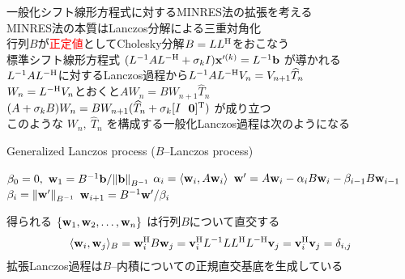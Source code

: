 

一般化シフト線形方程式に対するMINRES法の拡張を考える\\
\myitem MINRES法の本質はLanczos分解による三重対角化\\
行列$B$が\textcolor{red}{正定値}としてCholesky分解$B=LL^{\mathrm{H}}$をおこなう\\
\myitem 標準シフト線形方程式 $(L^{-1}AL^{-\mathrm{H}} + \sigma_{k}I)\vb{x}'^{(k)} = L^{-1}\vb{b}$ が導かれる\\
\myitem $L^{-1}AL^{-\mathrm{H}}$に対するLanczos過程から$L^{-1}AL^{-\mathrm{H}}V_{n} = V_{n+1}\widehat{T}_{n}$\\
\myitem $W_{n} = L^{-\mathrm{H}}V_{n}$とおくと$AW_{n}=BW_{n+1}\widehat{T}_{n}$\\
\myitem $(A+\sigma_{k}B)W_{n}=BW_{n+1}(\widehat{T}_{n} + \sigma_{k}[I \ \  \vb{0}]^{\mathrm{T}})$ が成り立つ\\
このような $W_{n},\ \widehat{T}_{n}$ を構成する一般化Lanczos過程は次のようになる
\vspace{0.2\baselineskip}
\begin{algorithm}[H]
   \caption{ Generalized Lanczos process ($B$--Lanczos process)}
   \label{alg-ex-lanczos}
   \begin{algorithmic}[1]
   	\vspace{-0.4\baselineskip}
   	\State $\beta_0 = 0,\ \vb{w}_1 = B^{-1}\vb{b} / \norm{\vb{b}}_{B^{-1}}$
   		\State $\alpha_i = \langle \vb{w}_i, A\vb{w}_i \rangle$
   		\State $\vb{w}' = A\vb{w}_i - \alpha_i B\vb{w}_i - \beta_{i-1} B \vb{w}_{i-1}$
   		\State $\beta_i = \norm{\vb{w}'}_{B^{-1}}$
   		\State $\vb{w}_{i+1} = B^{-1}\vb{w}' / \beta_i$
   	\EndFor
   \end{algorithmic}
\end{algorithm}

得られる $\{ \vb{w}_{1}, \vb{w}_{2}, \dots, \vb{w}_{n} \}$ は行列$B$について直交する
\begin{align}
	\langle \vb{w}_{i}, \vb{w}_{j} \rangle_{B} = \vb{w}_{i}^{\mathrm{H}} B \vb{w}_{j} = \vb{v}_{i}^{\mathrm{H}} L^{-1} LL^{\mathrm{H}} L^{-\mathrm{H}} \vb{v}_{j} = \vb{v}_{i}^{\mathrm{H}} \vb{v}_{j} = \delta_{i,j}
\end{align}
\myitem 拡張Lanczos過程は$B$--内積についての正規直交基底を生成している


